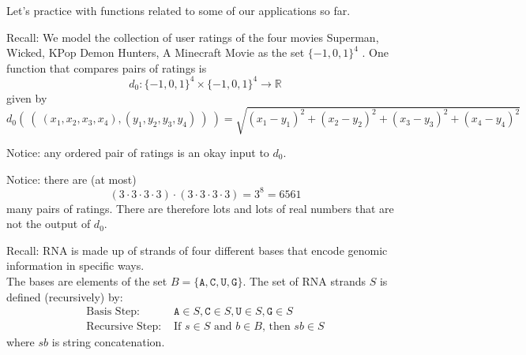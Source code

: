 \documentclass[12pt, oneside]{article}
\newcommand{\A}[0]{\texttt{A}}
\newcommand{\C}[0]{\texttt{C}}
\newcommand{\G}[0]{\texttt{G}}
\newcommand{\U}[0]{\texttt{U}}
\begin{document}
Let's practice with functions related to some of our applications so far.

Recall: We model the collection of user ratings of the four movies Superman, Wicked, KPop Demon Hunters, A Minecraft Movie as the set
$\{-1,0,1\}^4$ . One function that compares pairs of ratings is
$$d_0: \{-1,0,1\}^4 \times \{-1,0,1\}^4 \to \mathbb{R}$$
given by
\[
d_0 (~(~ (x_1, x_2, x_3, x_4), (y_1, y_2, y_3, y_4) ~) ~) = \sqrt{ (x_1 - y_1)^2 + (x_2 - y_2)^2 + (x_3 -y_3)^2 + (x_4 -y_4)^2}
\]

Notice: any ordered pair of ratings is an okay input to $d_0$.

Notice: there are (at most) 
\[
(3 \cdot 3 \cdot 3 \cdot 3)\cdot (3 \cdot 3 \cdot 3 \cdot 3) = 3^8 = 6561
\]
many pairs of ratings. There are therefore lots and lots of real numbers that are not the output of $d_0$.

\vfill

Recall: RNA is made up of strands of four different bases that encode genomic information
in specific ways.\\
The bases are elements of the set 
$B  = \{\A, \C, \U, \G \}$. The set of RNA strands $S$ is defined (recursively) by:
\[
\begin{array}{ll}
\textrm{Basis Step: } & \A \in S, \C \in S, \U \in S, \G \in S \\
\textrm{Recursive Step: } & \textrm{If } s \in S\textrm{ and }b \in B \textrm{, then }sb \in S
\end{array}
\]
where $sb$ is string concatenation.

\vfill
\end{document}
